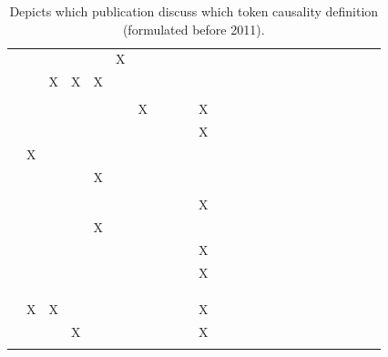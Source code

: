 \documentclass[11pt,a4paper]{book}
\theoremstyle{definition}
\theoremstyle{definition}
\theoremstyle{definition}
\theoremstyle{remark}
\begin{document}
\begin{table}
\begin{tabular}{lp{0.5cm}p{0.5cm}p{0.5cm}p{0.5cm}p{0.5cm}p{0.5cm}p{0.5cm}p{0.5cm}p{0.5cm}p{0.5cm}p{0.5cm}p{0.5cm}p{0.5cm}p{0.5cm}p{0.5cm}p{0.5cm}p{0.5cm}p{0.5cm}p{0.5cm}p{0.5cm}p{0.5cm}p{0.5cm}p{0.5cm}}
 \cite{blanchard2017cause}  	& 	& 	& 	& 	& X	& 	& 	& 	& 	& 	& 	& 	& 	& 	\\
 \cite{wright2017ness}  	& 	& X	& X	& X	& 	& 	& 	& 	& 	& 	& 	& 	& 	& 	\\
 \cite{icard2017normality} 	& 	& 	& 	& 	& 	& 	& 	& 	& 	& 	& 	& 	& 	& 	\\
 \cite{aleksandrowicz2017computational}  	& 	& 	& 	& 	& 	& X	& 	& 	& 	& X	& 	& 	& 	& 	\\
 \cite{fenton2017proposed}  	& 	& 	& 	& 	& 	& 	& 	& 	& 	& X	& 	& 	& 	& 	\\
 \cite{lagnado2017causation}  	& X	& 	& 	& 	& 	& 	& 	& 	& 	& 	& 	& 	& 	& 	\\
 \cite{bochman2018actual}  	& 	& 	& 	& X	& 	& 	& 	& 	& 	& 	& 	& 	& 	& 	\\
 \cite{ibeling2018conditional}  	& 	& 	& 	& 	& 	& 	& 	& 	& 	& 	& 	& 	& 	& 	\\
 \cite{beckers2018principled} 	& 	& 	& 	& 	& 	& 	& 	& 	& 	& X	& 	& 	& 	& 	\\
 \cite{bochman2018laws}  	& 	& 	& 	& X	& 	& 	& 	& 	& 	& 	& 	& 	& 	& 	\\
 \cite{denecker2018causal}  	& 	& 	& 	& 	& 	& 	& 	& 	& 	& X	& 	& 	& 	& 	\\
 \cite{batusov2018situation}  	& 	& 	& 	& 	& 	& 	& 	& 	& 	& X	& 	& 	& 	& 	\\
 \cite{denecker2019explaining}  	& 	& 	& 	& 	& 	& 	& 	& 	& 	& 	& 	& 	& 	& 	\\
 \cite{liepicna2019evaluation}  	& 	& 	& 	& 	& 	& 	& 	& 	& 	& 	& 	& 	& 	& 	\\
 \cite{leblanc2019explaining} 	& 	& 	& 	& 	& 	& 	& 	& 	& 	& 	& 	& 	& 	& 	\\
 \cite{liepicna2020arguing} 	& X	& X	& 	& 	& 	& 	& 	& 	& 	& X	& 	& 	& 	& 	\\
 \cite{khannecessary}  	& 	& 	& X	& 	& 	& 	& 	& 	& 	& X	& 	& 	& 	& 	\\
 \cite{ibeling2020probabilistic}  	& 	& 	& 	& 	& 	& 	& 	& 	& 	& 	& 	& 	& 	& 	\\

\bottomrule
\end{tabular}
\caption{Depicts which publication discuss which token causality definition (formulated before 2011).  }
\label{tab:definitions-1}
\end{table}
\end{document}
